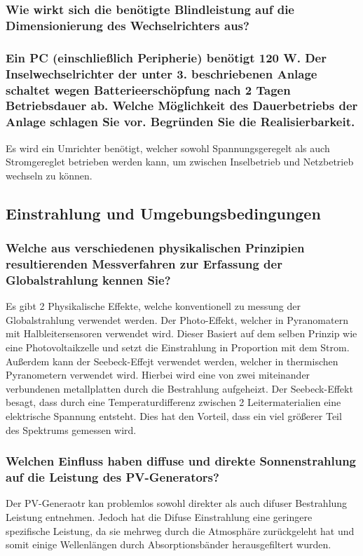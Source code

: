 \subsubsection{Wie wirkt sich die benötigte Blindleistung auf die Dimensionierung des Wechselrichters aus?}
\subsubsection{Ein PC (einschließlich Peripherie) benötigt 120 W. Der Inselwechselrichter der unter 3. beschriebenen Anlage schaltet wegen Batterieerschöpfung nach 2 Tagen Betriebsdauer ab. Welche Möglichkeit des Dauerbetriebs der Anlage schlagen Sie vor. Begründen Sie die Realisierbarkeit.}
Es wird ein Umrichter benötigt, welcher sowohl Spannungsgeregelt als auch Stromgereglet betrieben werden kann, um zwischen Inselbetrieb und Netzbetrieb wechseln zu können.
\subsection{Einstrahlung und Umgebungsbedingungen}
\subsubsection{Welche aus verschiedenen physikalischen Prinzipien resultierenden Messverfahren zur Erfassung der Globalstrahlung kennen Sie?}
Es gibt 2 Physikalische Effekte, welche konventionell zu messung der Globalstrahlung verwendet werden. 
Der Photo-Effekt, welcher in Pyranomatern mit Halbleitersensoren verwendet wird. 
Dieser Basiert auf dem selben Prinzip wie eine Photovoltaikzelle und setzt die Einstrahlung in Proportion mit dem Strom.
Außerdem kann der Seebeck-Effejt verwendet werden, welcher in thermischen Pyranometern verwendet wird.
Hierbei wird eine von zwei miteinander verbundenen metallplatten durch die Bestrahlung aufgeheizt. 
Der Seebeck-Effekt besagt, dass durch eine Temperaturdifferenz zwischen 2 Leitermaterialien eine elektrische Spannung entsteht.\cite{Wiki-Seebeck}
Dies hat den Vorteil, dass ein viel größerer Teil des Spektrums gemessen wird.

\subsubsection{Welchen Einfluss haben diffuse und direkte Sonnenstrahlung auf die Leistung des PV-Generators?}
Der PV-Generaotr kan problemlos sowohl direkter als auch difuser Bestrahlung Leistung entnehmen. 
Jedoch hat die Difuse Einstrahlung eine geringere spezifische Leistung, da sie mehrweg durch die Atmosphäre zurückgeleht hat und somit einige Wellenlängen durch Absorptionsbänder herausgefiltert wurden.
